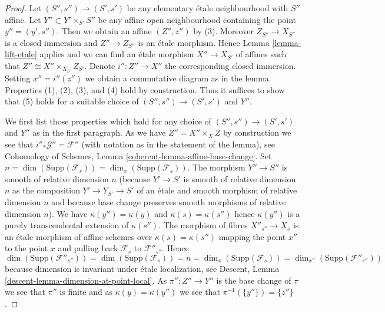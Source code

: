 \begin{proof}
Let $(S'', s'') \to (S', s')$ be any elementary \'etale neighbourhood
with $S''$ affine. Let $Y'' \subset Y' \times_{S'} S''$ be any affine
open neighbourhood containing the point $y'' = (y', s'')$. Then we
obtain an affine $(Z'', z'')$ by (3). Moreover $Z_{S''} \to X_{S''}$
is a closed immersion and $Z'' \to Z_{S''}$ is an \'etale
morphism. Hence
Lemma \ref{lemma-lift-etale}
applies and we can find an \'etale morphism $X'' \to X_{S'}$ of affines
such that $Z'' \cong X'' \times_{X_{S'}} Z_{S'}$. Denote $i'' : Z'' \to X''$
the corresponding closed immersion. Setting $x'' = i''(z'')$ we obtain a
commutative diagram as in the lemma.
Properties (1), (2), (3), and (4) hold by construction.
Thus it suffices to show that (5) holds for a suitable choice of
$(S'', s'') \to (S', s')$ and $Y''$.

\medskip\noindent
We first list those properties which hold for any choice of
$(S'', s'') \to (S', s')$ and $Y''$ as in the first paragraph.
As we have $Z'' = X'' \times_X Z$ by construction we see that
$i''_*\mathcal{G}'' = \mathcal{F}''$ (with notation as in the
statement of the lemma), see
Cohomology of Schemes, Lemma \ref{coherent-lemma-affine-base-change}.
Set $n = \dim(\text{Supp}(\mathcal{F}_s)) = \dim_x(\text{Supp}(\mathcal{F}_s))$.
The morphism $Y'' \to S''$ is smooth of relative dimension $n$
(because $Y' \to S'$ is smooth of relative dimension $n$
as the composition $Y' \to Y_{S'} \to S'$ of an \'etale and
smooth morphism of relative dimension $n$ and because base change
preserves smooth morphisms of relative dimension $n$).
We have $\kappa(y'') = \kappa(y)$ and $\kappa(s) = \kappa(s'')$
hence $\kappa(y'')$ is a purely transcendental extension of $\kappa(s'')$.
The morphism of fibres $X''_{s''} \to X_s$ is an \'etale morphism of affine
schemes over $\kappa(s) = \kappa(s'')$ mapping the point $x''$ to the
point $x$ and pulling back $\mathcal{F}_s$ to $\mathcal{F}''_{s''}$.
Hence
$$
\dim(\text{Supp}(\mathcal{F}''_{s''})) =
\dim(\text{Supp}(\mathcal{F}_s)) = n =
\dim_x(\text{Supp}(\mathcal{F}_s)) =
\dim_{x''}(\text{Supp}(\mathcal{F}''_{s''}))
$$
because dimension is invariant under \'etale localization, see
Descent, Lemma \ref{descent-lemma-dimension-at-point-local}.
As $\pi'' : Z'' \to Y''$ is the base change of $\pi$ we see that
$\pi''$ is finite and as $\kappa(y) = \kappa(y'')$ we see that
$\pi^{-1}(\{y''\}) = \{z''\}$.


\end{proof}
